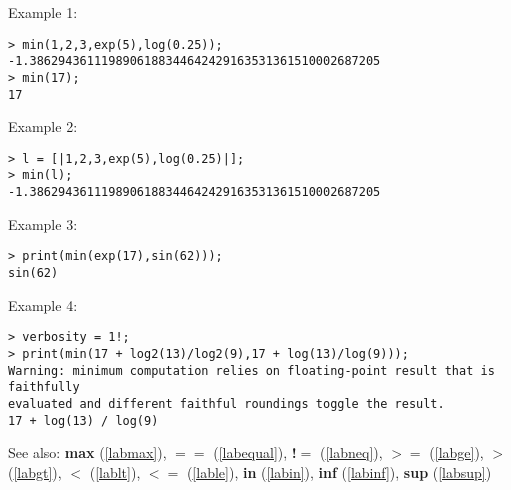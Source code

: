 \noindent Example 1: 
\begin{center}\begin{minipage}{15cm}\begin{Verbatim}[frame=single]
> min(1,2,3,exp(5),log(0.25));
-1.3862943611198906188344642429163531361510002687205
> min(17);
17
\end{Verbatim}
\end{minipage}\end{center}
\noindent Example 2: 
\begin{center}\begin{minipage}{15cm}\begin{Verbatim}[frame=single]
> l = [|1,2,3,exp(5),log(0.25)|];
> min(l);
-1.3862943611198906188344642429163531361510002687205
\end{Verbatim}
\end{minipage}\end{center}
\noindent Example 3: 
\begin{center}\begin{minipage}{15cm}\begin{Verbatim}[frame=single]
> print(min(exp(17),sin(62)));
sin(62)
\end{Verbatim}
\end{minipage}\end{center}
\noindent Example 4: 
\begin{center}\begin{minipage}{15cm}\begin{Verbatim}[frame=single]
> verbosity = 1!;
> print(min(17 + log2(13)/log2(9),17 + log(13)/log(9)));
Warning: minimum computation relies on floating-point result that is faithfully 
evaluated and different faithful roundings toggle the result.
17 + log(13) / log(9)
\end{Verbatim}
\end{minipage}\end{center}
See also: \textbf{max} (\ref{labmax}), \textbf{$==$} (\ref{labequal}), \textbf{!$=$} (\ref{labneq}), \textbf{$>=$} (\ref{labge}), \textbf{$>$} (\ref{labgt}), \textbf{$<$} (\ref{lablt}), \textbf{$<=$} (\ref{lable}), \textbf{in} (\ref{labin}), \textbf{inf} (\ref{labinf}), \textbf{sup} (\ref{labsup})
